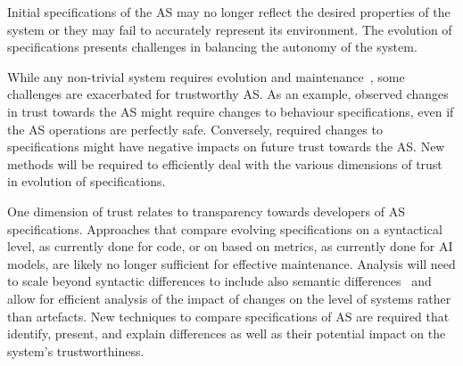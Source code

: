 \documentclass[sigconf,nonacm]{acmart}%
\begin{document}
    Initial specifications of the AS may no longer reflect the desired properties of the system or they may fail to accurately represent its environment. The evolution of specifications presents challenges in balancing the autonomy of the system.
	
    

    While any non-trivial system requires evolution and maintenance~\cite{Mens08}, some challenges are exacerbated for trustworthy AS. As an example, observed changes in trust towards the AS might require changes to behaviour specifications, even if the AS operations are perfectly safe. Conversely, required changes to specifications might have negative impacts on future trust towards the AS. New methods will be required to efficiently deal with the various dimensions of trust in evolution of specifications.

    One dimension of trust relates to transparency towards developers of AS specifications. Approaches that compare evolving specifications on a syntactical level, as currently done for code, or on based on metrics, as currently done for AI models, are likely no longer sufficient for effective maintenance. Analysis will need to scale beyond syntactic differences to include also semantic differences~\cite{MaozR18} and allow for efficient analysis of the impact of changes on the level of systems rather than artefacts. New techniques to compare specifications of AS are required that identify, present, and explain differences as well as their potential impact on the system's trustworthiness.
	
\end{document}
